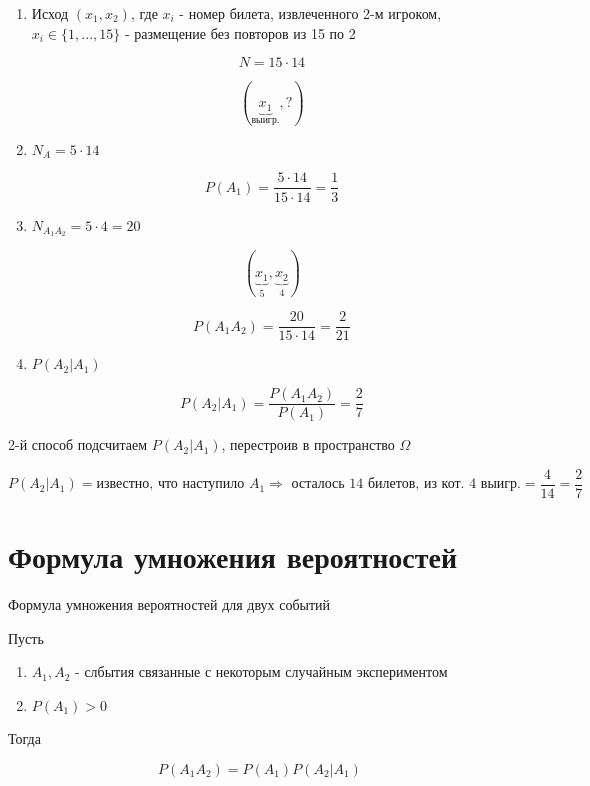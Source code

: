 \documentclass[a4paper, 14pt]{report}
\begin{document}
\begin{enumerate}
    \item Исход $(x_1,x_2)$, где $x_i$ - номер билета, извлеченного 2-м игроком, $x_i \in \{ 1, ... , 15 \}$ - размещение без повторов из 15 по 2

        $$
        N = 15 \cdot 14
        $$

        $$
        (\underbrace{x_1}_{\text{выигр.}}, ?)
        $$

    \item $N_A = 5 \cdot 14$

        $$
        P(A_1) = \frac{5 \cdot 14}{15 \cdot 14} = \frac{1}{3}
        $$

    \item $N_{A_1A_2} = 5 \cdot 4 = 20$

        $$
        (\underbrace{x_1}_5, \underbrace{x_2}_4)
        $$

        $$
        P(A_1A_2) = \frac{20}{15 \cdot 14} = \frac{2}{21}
        $$

    \item $P(A_2|A_1)$

        $$
        P(A_2 | A_1) = \frac{P(A_1A_2)}{P(A_1)} = \frac{2}{7}
        $$
\end{enumerate}

2-й способ подсчитаем $P(A_2|A_1)$, перестроив в пространство $\Omega$

$$
P(A_2|A_1) = \text{известно, что наступило } A_1 \Rightarrow \text{ осталось 14 билетов, из кот. 4 выигр.} = \frac{4}{14} = \frac{2}{7}
$$

\section{Формула умножения вероятностей}

\begin{theorem}
    Формула умножения вероятностей для двух событий

    Пусть 

    \begin{enumerate}
        \item $A_1, A_2$ - слбытия связанные с некоторым случайным экспериментом
        \item $P(A_1) > 0$
    \end{enumerate}

    Тогда

    $$
    P(A_1A_2) = P(A_1)P(A_2|A_1)
    $$
\end{theorem}
\end{document}
